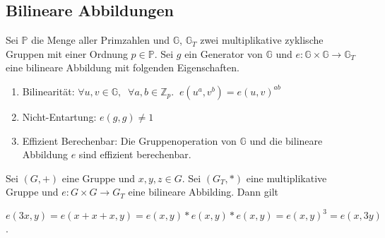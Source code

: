 \subsection{Bilineare Abbildungen}
\begin{definition}
	Sei $\mathbb{P}$ die Menge aller Primzahlen und $\mathbb{G}$, $\mathbb{G}_T$
	zwei multiplikative zyklische Gruppen mit einer Ordnung $p \in \mathbb{P}$.
	Sei $g$ ein Generator von $\mathbb{G}$ und $e: \mathbb{G} \times \mathbb{G}
	\to \mathbb{G}_T$ eine bilineare Abbildung mit folgenden Eigenschaften.

	\begin{enumerate}
		\item Bilinearität: $\forall u, v \in \mathbb{G},\;\; \forall a, b \in
			\mathbb{Z}_p. \;\; e(u^a, v^b) = e(u, v)^{ab}$
		\item Nicht-Entartung: $e(g, g) \neq 1$
		\item Effizient Berechenbar: Die Gruppenoperation von $\mathbb{G}$ und die
			bilineare Abbildung $e$ sind effizient berechenbar.
	\end{enumerate}
\end{definition}

\begin{example}
	Sei $(G, +)$ eine Gruppe und $x, y, z \in G$. Sei $(G_T, *)$ eine multiplikative
	Gruppe und $e: G \times G \to G_T$ eine bilineare Abbilding. Dann gilt

	$e(3x, y) = e(x+x+x, y) = e(x, y) * e(x, y) * e(x, y) = e(x, y)^3 = e(x,
	3y)$.
\end{example}
